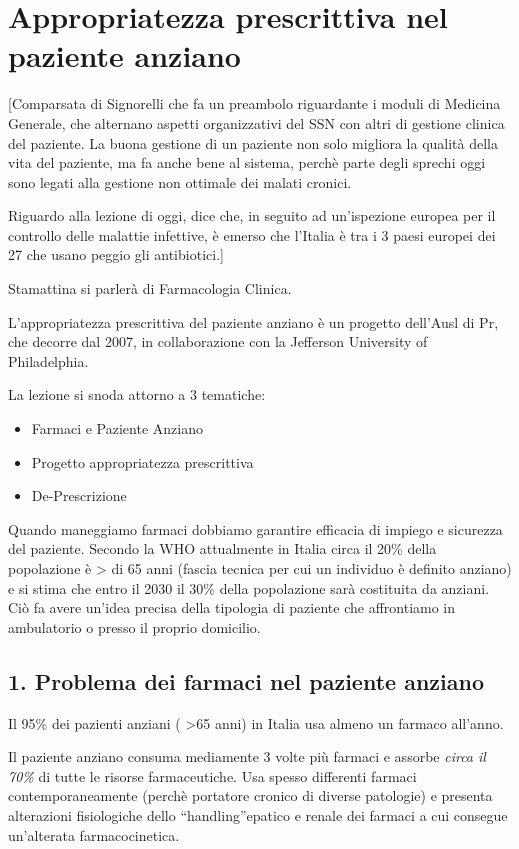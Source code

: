 \section{Appropriatezza prescrittiva nel paziente anziano}

{[}Comparsata di Signorelli che fa un preambolo riguardante i moduli di
Medicina Generale, che alternano aspetti organizzativi del SSN con altri
di gestione clinica del paziente. La buona gestione di un paziente non
solo migliora la qualità della vita del paziente, ma fa anche bene al
sistema, perchè parte degli sprechi oggi sono legati alla gestione non
ottimale dei malati cronici.

Riguardo alla lezione di oggi, dice che, in seguito ad un'ispezione
europea per il controllo delle malattie infettive, è emerso che l'Italia
è tra i 3 paesi europei dei 27 che usano peggio gli antibiotici.{]}

Stamattina si parlerà di Farmacologia Clinica.

L'appropriatezza prescrittiva del paziente anziano è un progetto
dell'Ausl di Pr, che decorre dal 2007, in collaborazione con la
Jefferson University of Philadelphia.

La lezione si snoda attorno a 3 tematiche:

\begin{itemize}
\item
  Farmaci e Paziente Anziano
\item
  Progetto appropriatezza prescrittiva
\item
  De-Prescrizione
\end{itemize}

  Quando maneggiamo farmaci dobbiamo garantire efficacia di impiego e
  sicurezza del paziente. Secondo la WHO attualmente in Italia circa il
  20\% della popolazione è \textgreater{} di 65 anni (fascia tecnica per
  cui un individuo è definito anziano) e si stima che entro il 2030 il
  30\% della popolazione sarà costituita da anziani. Ciò fa avere
  un'idea precisa della tipologia di paziente che affrontiamo in
  ambulatorio o presso il proprio domicilio.

  \subsection{1. Problema dei farmaci nel paziente anziano}

  Il 95\% dei pazienti anziani ( \textgreater{}65 anni) in Italia usa
  almeno un farmaco all'anno.

  Il paziente anziano consuma mediamente 3 volte più farmaci e assorbe
  \emph{circa il 70\%} di tutte le risorse farmaceutiche. Usa spesso
  differenti farmaci contemporaneamente (perchè portatore cronico di
  diverse patologie) e presenta alterazioni fisiologiche dello
  ``handling''epatico e renale dei farmaci a cui consegue un'alterata
  farmacocinetica.

